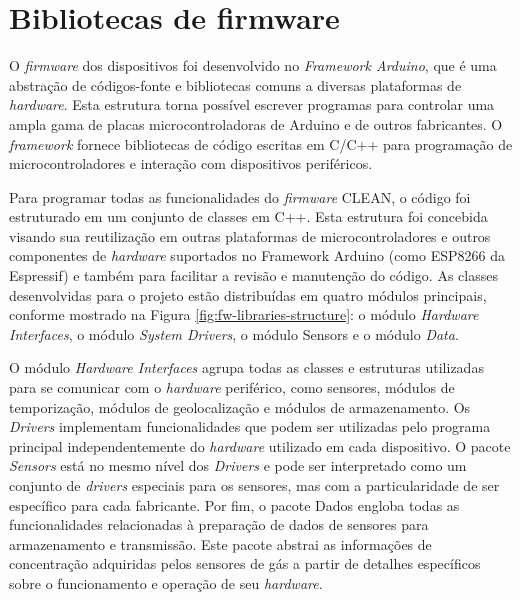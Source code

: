 \section{Bibliotecas de firmware}
O \textit{firmware} dos dispositivos foi desenvolvido no \textit{Framework Arduino}, que é uma abstração de códigos-fonte e bibliotecas comuns a diversas plataformas de \textit{\textit{hardware}}. Esta estrutura torna possível escrever programas para controlar uma ampla gama de placas microcontroladoras de Arduino e de outros fabricantes. O \textit{framework} fornece bibliotecas de código escritas em C/C++ para programação de microcontroladores e interação com dispositivos periféricos.

Para programar todas as funcionalidades do \textit{firmware} CLEAN, o código foi estruturado em um conjunto de classes em C++. Esta estrutura foi concebida visando sua reutilização em outras plataformas de microcontroladores e outros componentes de \textit{hardware} suportados no Framework Arduino (como ESP8266 da Espressif) e também para facilitar a revisão e manutenção do código. As classes desenvolvidas para o projeto estão distribuídas em quatro módulos principais, conforme mostrado na Figura \ref{fig:fw-libraries-structure}: o módulo \textit{Hardware Interfaces}, o módulo \textit{System Drivers}, o módulo \textit{}{Sensors} e o módulo \textit{Data}.

O módulo \textit{Hardware Interfaces} agrupa todas as classes e estruturas utilizadas para se comunicar com o \textit{hardware} periférico, como sensores, módulos de temporização, módulos de geolocalização e módulos de armazenamento. Os \textit{Drivers} implementam funcionalidades que podem ser utilizadas pelo programa principal independentemente do \textit{hardware} utilizado em cada dispositivo. O pacote \textit{Sensors} está no mesmo nível dos \textit{Drivers} e pode ser interpretado como um conjunto de \textit{drivers} especiais para os sensores, mas com a particularidade de ser específico para cada fabricante. Por fim, o pacote Dados engloba todas as funcionalidades relacionadas à preparação de dados de sensores para armazenamento e transmissão. Este pacote abstrai as informações de concentração adquiridas pelos sensores de gás a partir de detalhes específicos sobre o funcionamento e operação de seu \textit{hardware}.

